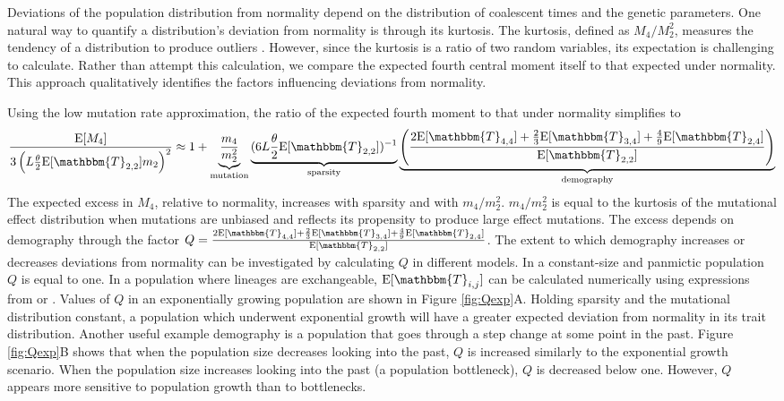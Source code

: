 Deviations of the population distribution from normality depend on the
distribution of coalescent times and the genetic parameters. One natural way to
quantify a distribution's deviation from normality is through its kurtosis. The
kurtosis, defined as $M_4/M_2^2$, measures the tendency of a
distribution to produce outliers \citet{Westfall2014}. However, since the
kurtosis is a ratio of two random variables, its expectation is challenging to
calculate. Rather than attempt this calculation, we compare the expected fourth
central moment itself to that expected under normality. This approach
qualitatively identifies the factors influencing deviations from normality.

Using the low mutation rate approximation, the ratio of the expected fourth
moment to that under normality simplifies to
\begin{equation}
  \label{eq:popmom4coal}
  \frac{\E[M_4]}{3\left(L \T \E[\mathbbm{T}_{2,2}] m_2\right)^2} \approx 1 +
  \underbrace{\frac{m_4}{m_2^2}}_{\text{mutation}} \underbrace{(6 L \T \E[\mathbbm{T}_{2,2}])^{-1}}_{\text{sparsity}}
      \underbrace{\left( \frac{2\E[\mathbbm{T}_{4,4}] +
      \frac{2}{3}\E[\mathbbm{T}_{3,4}] +
      \frac{4}{9}\E[\mathbbm{T}_{2,4}]}{\E[\mathbbm{T}_{2,2}]}\right)}_{\text{demography}}
\end{equation}
The expected excess in $M_4$, relative to normality, increases with sparsity and
with $m_4/m_2^2$. $m_4/m_2^2$ is equal to the kurtosis of the mutational effect
distribution when mutations are unbiased and reflects its propensity to produce
large effect mutations. The excess depends on demography through the factor $Q
= \frac{2\E[\mathbbm{T}_{4,4}] + \frac{2}{3}\E[\mathbbm{T}_{3,4}]
+ \frac{4}{9}\E[\mathbbm{T}_{2,4}]}{\E[\mathbbm{T}_{2,2}]}$. The extent to which
demography increases or decreases deviations from normality can be investigated
by calculating $Q$ in different models. In a constant-size and panmictic
population $Q$ is equal to one. In a population where lineages are exchangeable,
$\E[\mathbbm{T}_{i,j}]$ can be calculated numerically using expressions from
\citet{Griffiths1998} or \citet{Polanski2003a}. Values of $Q$ in an exponentially growing population are
shown in Figure \ref{fig:Qexp}A. Holding sparsity and the mutational
distribution constant, a population which underwent exponential growth will have
a greater expected deviation from normality in its trait distribution. Another
useful example demography is a population that goes through a step change at
some point in the past. Figure \ref{fig:Qexp}B shows that when the population
size decreases looking into the past, $Q$ is increased similarly to the
exponential growth scenario. When the population size increases looking into the
past (a population bottleneck), $Q$ is decreased below one. However, $Q$ appears
more sensitive to population growth than to bottlenecks.


